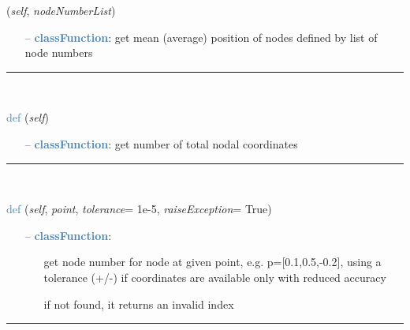 \begin{itemize}[leftmargin=1.4cm]
\begin{itemize}[leftmargin=1.4cm]
\begin{itemize}[leftmargin=1.4cm]
\begin{itemize}[leftmargin=0.5cm]
\begin{itemize}[leftmargin=1.4cm]
\begin{itemize}[leftmargin=1.4cm]
\begin{itemize}[leftmargin=0.5cm]
\begin{flushleft}
({\it self}, {\it nodeNumberList})
\end{flushleft}
\setlength{\itemindent}{0.7cm}
\begin{itemize}[leftmargin=0.7cm]
\item[--]\textcolor{steelblue}{\bf classFunction}: get mean (average) position of nodes defined by list of node numbers
\vspace{12pt}\end{itemize}
%
\noindent\rule{8cm}{0.75pt}\vspace{1pt} \\ 
\begin{flushleft}
\noindent \textcolor{steelblue}{def {\bf {}}}\label{sec:FEM:FEMinterface:NumberOfCoordinates}
({\it self})
\end{flushleft}
\setlength{\itemindent}{0.7cm}
\begin{itemize}[leftmargin=0.7cm]
\item[--]\textcolor{steelblue}{\bf classFunction}: get number of total nodal coordinates
\vspace{12pt}\end{itemize}
%
\noindent\rule{8cm}{0.75pt}\vspace{1pt} \\ 
\begin{flushleft}
\noindent \textcolor{steelblue}{def {\bf {}}}\label{sec:FEM:FEMinterface:GetNodeAtPoint}
({\it self}, {\it point}, {\it tolerance}= 1e-5, {\it raiseException}= True)
\end{flushleft}
\setlength{\itemindent}{0.7cm}
\begin{itemize}[leftmargin=0.7cm]
\item[--]\textcolor{steelblue}{\bf classFunction}: \vspace{-6pt}
\begin{itemize}[leftmargin=1.2cm]
\setlength{\itemindent}{-0.7cm}
\item[]get node number for node at given point, e.g. p=[0.1,0.5,-0.2], using a tolerance (+/-) if coordinates are available only with reduced accuracy
\item[]if not found, it returns an invalid index
\end{itemize}
\vspace{12pt}\end{itemize}
%
\noindent\rule{8cm}{0.75pt}\vspace{1pt} \\ 

\end{itemize}
\end{itemize}
\end{itemize}
\end{itemize}
\end{itemize}
\end{itemize}
\end{itemize}
